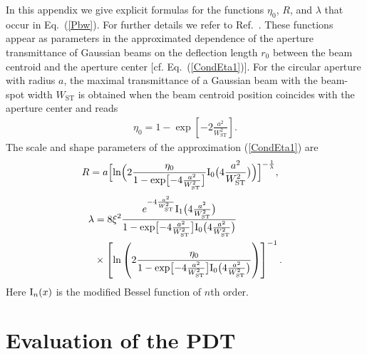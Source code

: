 \documentclass[aps,pra,twocolumn,a4paper,nofootinbib,preprintnumbers] {revtex4-1}
\newcommand{\I}{{\rm{I}}}
\begin{document}
	In this appendix we give explicit formulas for the functions  $\eta_0$, $R$, and $\lambda$ that  occur in Eq.~(\ref{Pbw}).
	For further details we refer to Ref.~\cite{Vasylyev2012}.
	These functions appear as parameters in the approximated dependence of the aperture  transmittance of Gaussian beams  on the deflection length $r_0$ between the beam centroid and the aperture center [cf. Eq.~(\ref{CondEta1})].
	For the circular aperture with radius $a$, the maximal transmittance of a Gaussian beam with  the beam-spot width $W_{\mathrm{ST}}$ is obtained when the beam centroid position coincides with the aperture center and reads
		\begin{align}
		\eta_0=1-\exp\left[-2\frac{a^2}{W_{\mathrm{ST}}^2}\right].
		\end{align}
	The scale and shape parameters of the approximation (\ref{CondEta1}) are
		\begin{align}
		& R=a\Bigl[\ln\Bigl(2\frac{\eta_0}{1-\exp\bigl[-4\frac{a^2}{W_{\mathrm{ST}}^2}\bigr]}\I_0\bigl(4\frac{a^2}{W_{\mathrm{ST}}^2}\bigr)\Bigr)\Bigr]^{-\frac{1}{\lambda}},
		\end{align}
		\begin{align}
		\lambda&=8\xi^2\frac{e^{-4\frac{a^2}{W_{\mathrm{ST}}^2}}\I_1\bigl(4\frac{a^2}{W_{\mathrm{ST}}^2}\bigr)}{1-\exp\bigl[-4\frac{a^2}{W_{\mathrm{ST}}^2}\bigr]\I_0\bigl(4\frac{a^2}{W_{\mathrm{ST}}^2}\bigr)}\nonumber\\
		&\times \left[\ln\left(2\frac{\eta_0 }{1-\exp\bigl[-4\frac{a^2}{W_{\mathrm{ST}}^2}\bigr]\I_0\bigl(4\frac{a^2}{W_{\mathrm{ST}}^2}\bigr)}\right)\right]^{-1}.
		\end{align}
	Here  $\I_n(x)$ is the modified Bessel function of $n$th order.




\section{Evaluation of the PDT}\label{app:PDTeval}
\end{document}
